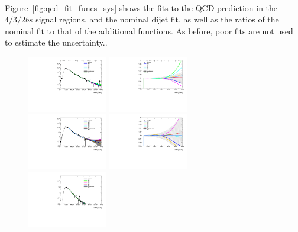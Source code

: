 \paragraph{}
Figure~\ref{fig:qcd_fit_funcs_sys} shows the fits to the QCD prediction in the $4/3/2bs$ signal regions, and the nominal dijet fit, as well as the ratios of the nominal fit to that of the additional functions.
As before, poor fits are not used to estimate the uncertainty..

\begin{figure}[htbp!]
\begin{center}
\includegraphics[width=0.31\textwidth,angle=-90]{figures/boosted/Syst_Smooth/smoothFuncCompare_22_comp.pdf}
\includegraphics[width=0.31\textwidth,angle=-90]{figures/boosted/Syst_Smooth/smoothFuncCompare_22_comp_ratio.pdf} \\
\includegraphics[width=0.31\textwidth,angle=-90]{figures/boosted/Syst_Smooth/smoothFuncCompare_33_comp.pdf}
\includegraphics[width=0.31\textwidth,angle=-90]{figures/boosted/Syst_Smooth/smoothFuncCompare_33_comp_ratio.pdf} \\
\includegraphics[width=0.31\textwidth,angle=-90]{figures/boosted/Syst_Smooth/smoothFuncCompare_44_comp.pdf}

\end{center}
\end{figure}
